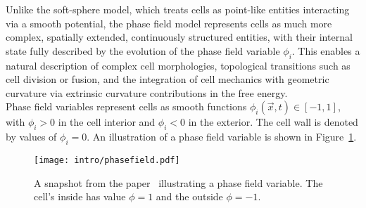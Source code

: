 Unlike the soft-sphere model, which treats cells as point-like entities interacting via a smooth potential, the phase field model represents cells as much more complex, spatially extended, continuously structured entities, with their internal state fully described by the evolution of the phase field variable $\phi_i$. 
This enables a natural description of complex cell morphologies, topological transitions such as cell division or fusion, and the integration of cell mechanics with geometric curvature via extrinsic curvature contributions in the free energy. \\
Phase field variables represent cells as smooth functions $\phi_i(\vec{x}, t) \in [-1, 1]$, with $\phi_i > 0$ in the cell interior and $\phi_i <0$ in the exterior. 
The cell wall is denoted by values of $\phi_i = 0$. 
An illustration of a phase field variable is shown in Figure~\ref{fig:phasefield}. \\
\begin{figure}[h!]
	\centering
	\texttt{[image: intro/phasefield.pdf]}
	\caption{A snapshot from the paper~\cite{alert2020} illustrating a phase field variable. 
	The cell's inside has value $\phi = 1$ and the outside $\phi = -1$. 
	}
	\label{fig:phasefield}
\end{figure}

